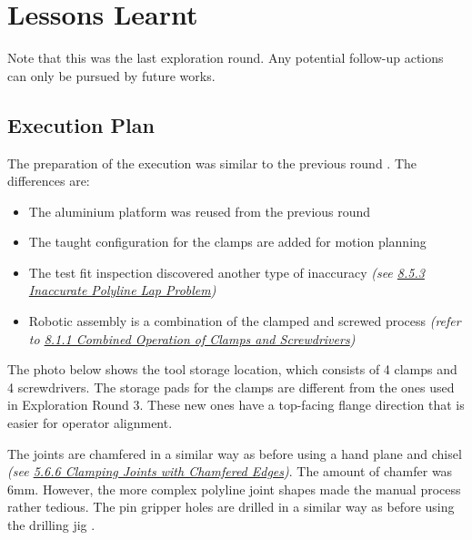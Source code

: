

\section{Lessons Learnt}
\label{section:exploration_5_lessons_learnt}

Note that this was the last exploration round. Any potential follow-up actions can only be pursued by future works.

\subsection{Execution Plan}
\label{subsection:exploration_5_execution_plan}

The preparation of the execution was similar to the previous round . The differences are:

\begin{itemize}
	\item The aluminium platform was reused from the previous round

	\item The taught configuration for the clamps are added for motion planning

	\item The test fit inspection discovered another type of inaccuracy \textit{(see \ul{8.5.3 Inaccurate Polyline Lap Problem})}

	\item Robotic assembly is a combination of the clamped and screwed process \textit{(refer to \ul{8.1.1 Combined Operation of Clamps and Screwdrivers})}

\end{itemize}
The photo below shows the tool storage location, which consists of 4 clamps and 4 screwdrivers. The storage pads for the clamps are different from the ones used in Exploration Round 3. These new ones have a top-facing flange direction that is easier for operator alignment.




The joints are chamfered in a similar way as before using a hand plane and chisel \textit{(see \ul{5.6.6 Clamping Joints with Chamfered Edges})}. The amount of chamfer was 6mm. However, the more complex polyline joint shapes made the manual process rather tedious. The pin gripper holes are drilled in a similar way as before using the drilling jig .

